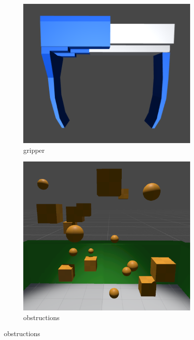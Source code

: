 \begin{figure}
\centering
\begin{subfigure}[t]{0.33\textwidth}
\centering
\includegraphics[width=\linewidth]{figures/gripper}
\caption{gripper}
\label{fig:gripper-sim}
\end{subfigure}%
    \hfill
\begin{subfigure}[t]{0.33\textwidth}
\centering
\includegraphics[width=\linewidth]{figures/obstructions}
\caption{obstructions}

\end{subfigure}
\end{figure}
